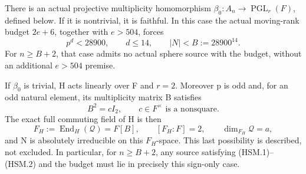 \begin{theorem}[D-TD41]
There is an actual projective multiplicity homomorphism
\(\beta_0:A_n\to\operatorname{PGL}_r(F)\), defined below.
If it is nontrivial, it is faithful.  In this case the actual
moving-rank budget \(2e+6\), together with \(e>504\), forces
\[
 p^d<28900,\qquad d\le14,\qquad |N|<B:=28900^{14}.
 \tag{HSM.4}
\]
For \(n\ge B+2\), that case admits no actual sphere source
with the budget, without an additional \(e>504\) premise.

If \(\beta_0\) is trivial, H acts linearly over F and
\(r=2\).  Moreover p is odd and, for an odd natural element,
its multiplicity matrix B satisfies
\[
                   B^2=cI_2,\qquad c\in F^\times
                   \text{ is a nonsquare}.
 \tag{HSM.5}
\]
The exact full commuting field of H is then
\[
 F_H:=\operatorname{End}_H(\mathcal Q)=F[B],
 \qquad [F_H:F]=2,
 \qquad \dim_{F_H}\mathcal Q=a,
 \tag{HSM.6}
\]
and N is absolutely irreducible on this \(F_H\)-space.
This last possibility is described, not excluded.  In particular,
for \(n\ge B+2\), any source satisfying (HSM.1)--(HSM.2)
and the budget must lie in precisely this sign-only case.
\end{theorem}

